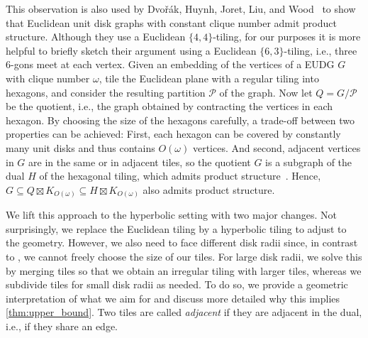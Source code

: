\documentclass[a4paper,english,cleveref,thm-restate]{lipics-v2021}
\newcommand{\calP}{\ensuremath{\mathcal{P}}\xspace}
\begin{document}
This observation is also used by Dvořák, Huynh, Joret, Liu, and Wood~\cite{dvorak_notes_2021} to show that Euclidean unit disk graphs with constant clique number admit product structure.
Although they use a Euclidean $ \{ 4, 4 \} $-tiling, for our purposes it is more helpful to briefly sketch their argument using a Euclidean $ \{ 6, 3 \} $-tiling, i.e., three 6-gons meet at each vertex.
%
Given an embedding of the vertices of a EUDG $G$ with clique number $ \omega $, tile the Euclidean plane with a regular tiling into hexagons, and consider the resulting partition $\calP$ of the graph.
Now let $ Q = G / \calP $ be the quotient, i.e., the graph obtained by contracting the vertices in each hexagon.
By choosing the size of the hexagons carefully, a trade-off between two properties can be achieved: 
First, each hexagon can be covered by constantly many unit disks and thus contains $ O(\omega) $ vertices.
And second, adjacent vertices in $ G $ are in the same or in adjacent tiles, so the quotient $ G $ is a subgraph of the dual $ H $ of the hexagonal tiling, which admits product structure~\cite{dujmovic_planar_2019}.
Hence, $ G \subseteq Q \boxtimes K_{O(\omega)} \subseteq H \boxtimes K_{O(\omega)} $ also admits product structure.

We lift this approach to the hyperbolic setting with two major changes.
Not surprisingly, we replace the Euclidean tiling by a hyperbolic tiling to adjust to the geometry.
However, we also need to face different disk radii since, in contrast to \cite{dvorak_notes_2021}, we cannot freely choose the size of our tiles.
For large disk radii, we solve this by merging tiles so that we obtain an irregular tiling with larger tiles, whereas we subdivide tiles for small disk radii as needed.
%
To do so, we provide a geometric interpretation of what we aim for and discuss more detailed why this implies \cref{thm:upper_bound}.
Two tiles are called \emph{adjacent} if they are adjacent in the dual, i.e., if they share an edge.
\end{document}
